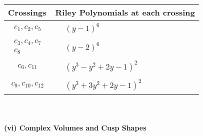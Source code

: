 \documentclass[1p]{elsarticle_modified}
\theoremstyle{definition}
\begin{document}
\begin{tabular}{m{50pt}|m{274pt}}
Crossings & \hspace{64pt}Riley Polynomials at each crossing \\
\hline $$\begin{aligned}c_{1},c_{2},c_{5}\end{aligned}$$&$\begin{aligned}
&(y-1)^6
\end{aligned}$\\
\hline $$\begin{aligned}c_{3},c_{4},c_{7}\\c_{8}\end{aligned}$$&$\begin{aligned}
&(y-2)^6
\end{aligned}$\\
\hline $$\begin{aligned}c_{6},c_{11}\end{aligned}$$&$\begin{aligned}
&(y^3- y^2+2 y-1)^2
\end{aligned}$\\
\hline $$\begin{aligned}c_{9},c_{10},c_{12}\end{aligned}$$&$\begin{aligned}
&(y^3+3 y^2+2 y-1)^2
\end{aligned}$\\
\hline
\end{tabular}\\~\\
\newpage\flushleft \textbf{(vi) Complex Volumes and Cusp Shapes}
\end{document}
